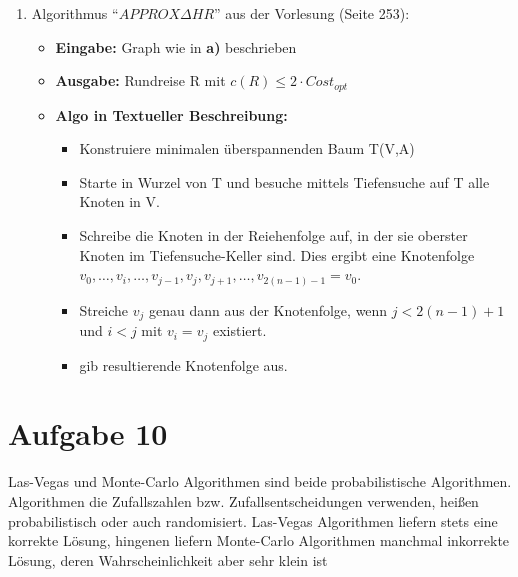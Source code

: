 \documentclass[10pt,a4paper]{article}
\begin{document}
\begin{enumerate}[label={\alph*)}]
        \item Algorithmus ``$APPROX \Delta HR$'' aus der Vorlesung (Seite 253):
            \begin{itemize}
                \item \textbf{Eingabe:} Graph wie in \textbf{a)} beschrieben
                \item \textbf{Ausgabe:} Rundreise R mit $c(R) \leq 2 \cdot Cost_{opt}$
                \item \textbf{Algo in Textueller Beschreibung:} \\
                    \begin{itemize}
                        \item Konstruiere minimalen überspannenden Baum T(V,A)
                        \item Starte in Wurzel von T und besuche mittels Tiefensuche
                            auf T alle Knoten in V.
                        \item Schreibe die Knoten in der Reiehenfolge auf, in der
                            sie oberster Knoten im Tiefensuche-Keller sind. Dies
                            ergibt eine Knotenfolge $v_0,\ldots,v_i,\ldots,
                            v_{j-1},v_j,v_{j+1},\ldots,v_{2(n-1)-1} = v_0$.
                        \item Streiche $v_j$ genau dann aus der Knotenfolge, wenn
                        $ j < 2(n-1) + 1 $ und $ i < j $ mit $ v_i = v_j$ existiert.
                        \item gib resultierende Knotenfolge aus.
                    \end{itemize}

            \end{itemize}




    \end{enumerate}


\section*{Aufgabe 10}
    Las-Vegas und Monte-Carlo Algorithmen sind beide
    probabilistische Algorithmen. Algorithmen die Zufallszahlen
    bzw. Zufallsentscheidungen verwenden, heißen probabilistisch
    oder auch randomisiert. Las-Vegas Algorithmen liefern stets
    eine korrekte Lösung, hingenen liefern Monte-Carlo Algorithmen
    manchmal inkorrekte Lösung, deren Wahrscheinlichkeit aber sehr klein ist
\end{document}
